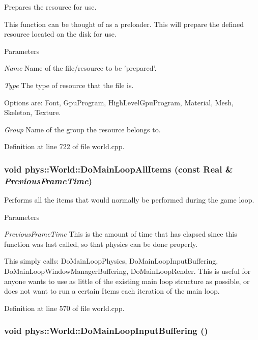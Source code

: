 Prepares the resource for use. 

This function can be thought of as a preloader. This will prepare the defined resource located on the disk for use. 
\begin{DoxyParams}{Parameters}
\item[{\em Name}]Name of the file/resource to be 'prepared'. \item[{\em Type}]The type of resource that the file is. \par
 Options are: Font, GpuProgram, HighLevelGpuProgram, Material, Mesh, Skeleton, Texture. \item[{\em Group}]Name of the group the resource belongs to. \end{DoxyParams}


Definition at line 722 of file world.cpp.

\hypertarget{classphys_1_1World_a25c2583425bfe3d0d2bfce1093f0175e}{
\subsubsection[{DoMainLoopAllItems}]{\setlength{\rightskip}{0pt plus 5cm}void phys::World::DoMainLoopAllItems (const {\bf Real} \& {\em PreviousFrameTime})}}
\label{da/ddf/classphys_1_1World_a25c2583425bfe3d0d2bfce1093f0175e}


Performs all the items that would normally be performed during the game loop. 


\begin{DoxyParams}{Parameters}
\item[{\em PreviousFrameTime}]This is the amount of time that has elapsed since this function was last called, so that physics can be done properly.\end{DoxyParams}
This simply calls: DoMainLoopPhysics, DoMainLoopInputBuffering, DoMainLoopWindowManagerBuffering, DoMainLoopRender. This is useful for anyone wants to use as little of the existing main loop structure as possible, or does not want to run a certain Items each iteration of the main loop. 

Definition at line 570 of file world.cpp.

\hypertarget{classphys_1_1World_af4204b587fcc71e8313dd97d476378d6}{
\subsubsection[{DoMainLoopInputBuffering}]{\setlength{\rightskip}{0pt plus 5cm}void phys::World::DoMainLoopInputBuffering ()}}
\label{da/ddf/classphys_1_1World_af4204b587fcc71e8313dd97d476378d6}


